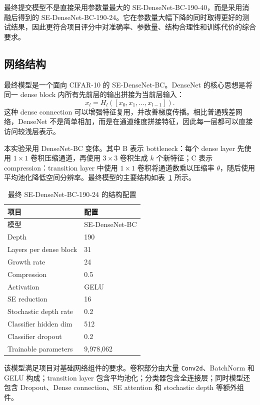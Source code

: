 \documentclass[UTF8,a4paper,11pt]{ctexart}
\begin{document}
最终提交模型不是直接采用参数量最大的 SE-DenseNet-BC-190-40，而是采用消融后得到的 SE-DenseNet-BC-190-24。它在参数量大幅下降的同时取得更好的测试结果，因此更符合项目评分中对准确率、参数量、结构合理性和训练代价的综合要求。

\subsection{网络结构}

最终模型是一个面向 CIFAR-10 的 SE-DenseNet-BC。DenseNet 的核心思想是将同一 dense block 内所有先前层的输出拼接为当前层输入：
\[
x_l = H_l([x_0,x_1,\ldots,x_{l-1}]).
\]
这种 dense connection 可以增强特征复用，并改善梯度传播。相比普通残差网络，DenseNet 不是简单相加，而是在通道维度拼接特征，因此每一层都可以直接访问较浅层表示。

本实验采用 DenseNet-BC 变体。其中 B 表示 bottleneck：每个 dense layer 先使用 $1\times1$ 卷积压缩通道，再使用 $3\times3$ 卷积生成 $k$ 个新特征；C 表示 compression：transition layer 中使用 $1\times1$ 卷积将通道数乘以压缩率 $\theta$，随后使用平均池化降低空间分辨率。最终模型的主要结构如表~\ref{tab:final_architecture} 所示。

\begin{table}[H]
  \centering
  \caption{最终 SE-DenseNet-BC-190-24 的结构配置}
  \label{tab:final_architecture}
  \begin{tabular}{ll}
    \toprule
    项目 & 配置 \\
    \midrule
    模型 & SE-DenseNet-BC \\
    Depth & 190 \\
    Layers per dense block & 31 \\
    Growth rate & 24 \\
    Compression & 0.5 \\
    Activation & GELU \\
    SE reduction & 16 \\
    Stochastic depth rate & 0.2 \\
    Classifier hidden dim & 512 \\
    Classifier dropout & 0.2 \\
    Trainable parameters & 9,978,062 \\
    \bottomrule
  \end{tabular}
\end{table}

该模型满足项目对基础网络组件的要求。卷积部分由大量 \texttt{Conv2d}、BatchNorm 和 GELU 构成；transition layer 包含平均池化；分类器包含全连接层；同时模型还包含 Dropout、Dense connection、SE attention 和 stochastic depth 等额外组件。
\end{document}
